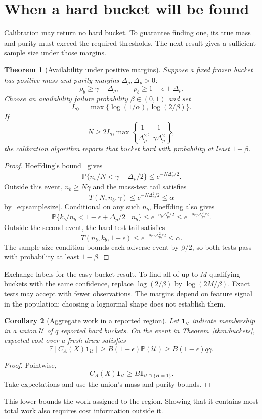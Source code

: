 \documentclass[10pt,letterpaper]{article}
\newtheorem{theorem}{Theorem}
\newtheorem{corollary}[theorem]{Corollary}
\newcommand{\Prb}{\mathbb P}
\newcommand{\E}{\mathbb E}
\newcommand{\ind}{\mathbf1}
\begin{document}
\section{When a hard bucket will be found}
Calibration may return no hard bucket. To guarantee finding one, its true mass and purity must exceed the required thresholds. The next result gives a sufficient sample size under those margins.

\begin{theorem}[Availability under positive margins]\label{thm:availability}
Suppose a fixed frozen bucket has positive mass and purity margins $\Delta_\rho,\Delta_p>0$:
\[
 \rho_b\ge\gamma+\Delta_\rho,\qquad
 p_b\ge1-\epsilon+\Delta_p.
\]
Choose an availability failure probability $\beta\in(0,1)$ and set
\[
 L_0=\max\{\log(1/\alpha),\log(2/\beta)\}.
\]
If
\begin{equation}\label{eq:samplesize}
 N\ge2L_0\max\left\{\frac1{\Delta_\rho^2},\ \frac1{\gamma\Delta_p^2}\right\},
\end{equation}
the calibration algorithm reports that bucket hard with probability at least $1-\beta$.
\end{theorem}
\begin{proof}
Hoeffding's bound~\cite{hoeffding} gives
\[
 \Prb\{n_b/N<\gamma+\Delta_\rho/2\}\le e^{-N\Delta_\rho^2/2}.
\]
Outside this event, $n_b\ge N\gamma$ and the mass-test tail satisfies
\[
 T(N,n_b,\gamma)\le e^{-N\Delta_\rho^2/2}\le\alpha
\]
by~\eqref{eq:samplesize}. Conditional on any such $n_b$, Hoeffding also gives
\[
 \Prb\{k_b/n_b<1-\epsilon+\Delta_p/2\mid n_b\}
 \le e^{-n_b\Delta_p^2/2}\le e^{-N\gamma\Delta_p^2/2}.
\]
Outside the second event, the hard-test tail satisfies
\[
 T(n_b,k_b,1-\epsilon)\le e^{-N\gamma\Delta_p^2/2}\le\alpha.
\]
The sample-size condition bounds each adverse event by $\beta/2$, so both tests pass with probability at least $1-\beta$.
\end{proof}
Exchange labels for the easy-bucket result. To find all of up to $M$ qualifying buckets with the same confidence, replace $\log(2/\beta)$ by $\log(2M/\beta)$. Exact tests may accept with fewer observations. The margins depend on feature signal in the population; choosing a lognormal shape does not establish them.

\begin{corollary}[Aggregate work in a reported region]\label{cor:work}
Let $\ind_{\mathcal U}$ indicate membership in a union $\mathcal U$ of $q$ reported hard buckets. On the event in Theorem~\ref{thm:buckets}, expected cost over a fresh draw satisfies
\begin{equation}
 \E[C_A(X)\ind_{\mathcal U}]\ge B(1-\epsilon)\Prb(\mathcal U)
                                    \ge B(1-\epsilon)q\gamma.
\end{equation}
\end{corollary}
\begin{proof}
Pointwise,
\[
 C_A(X)\ind_{\mathcal U}\ge B\ind_{\mathcal U\cap\{H=1\}}.
\]
Take expectations and use the union's mass and purity bounds.
\end{proof}
This lower-bounds the work assigned to the region. Showing that it contains most total work also requires cost information outside it.
\end{document}
